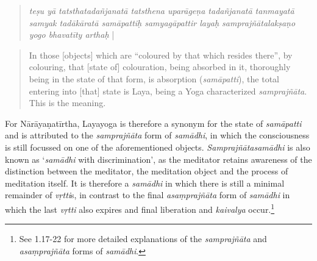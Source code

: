 \begin{quote}
\textit{teṣu yā tatsthatadañjanatā tatsthena uparāgeṇa tadañjanatā tanmayatā samyak tadākāratā samāpattiḥ samyagāpattir layaḥ samprajñātalakṣaṇo yogo bhavatīty arthaḥ} |
\end{quote}
\begin{quote}
In those [objects] which are ``coloured by that which resides there'', by colouring, that [state of] colouration, being absorbed in it, thoroughly being in the state of that form, is absorption (\textit{samāpatti}), the total entering into [that] state is Laya, being a Yoga characterized \textit{samprajñāta}. This is the meaning.
\end{quote}

For Nārāyaṇatīrtha, Layayoga is therefore a synonym for the state of \textit{samāpatti} and is attributed to the \textit{samprajñāta} form of \textit{samādhi}, in which the consciousness is still focussed on one of the aforementioned objects. \textit{Samprajñātasamādhi} is also known as `\textit{samādhi} with discrimination', as the meditator retains awareness of the distinction between the meditator, the meditation object and the process of meditation itself. It is therefore a \textit{samādhi} in which there is still a minimal remainder of \textit{vṛtti}s, in contrast to the final \textit{asaṃprajñāta} form of \textit{samādhi} in which the last \textit{vṛtti} also expires and final liberation and \textit{kaivalya} occur.\footnote{See  1.17-22 for more detailed explanations of the \textit{samprajñāta} and \textit{asaṃprajñāta} forms of \textit{samādhi}.}

